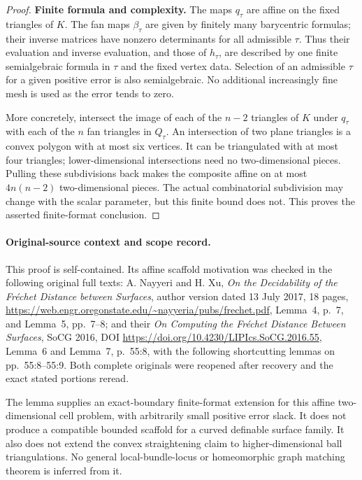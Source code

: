 \begin{proof}
\textbf{Finite formula and complexity.}\quad
The maps $q_\tau$ are affine on the fixed triangles of $K$.
The fan maps $\beta_\tau$ are given by finitely many barycentric
formulas; their inverse matrices have nonzero determinants for all
admissible $\tau$. Thus their evaluation and inverse evaluation,
and those of $h_\tau$, are described by one finite semialgebraic
formula in $\tau$ and the fixed vertex data. Selection of an
admissible $\tau$ for a given positive error is also semialgebraic.
No additional increasingly fine mesh is used as the error tends
to zero.

More concretely, intersect the image of each of the $n-2$ triangles
of $K$ under $q_\tau$ with each of the $n$ fan triangles in $Q_\tau$.
An intersection of two plane triangles is a convex polygon with at
most six vertices. It can be triangulated with at most four triangles;
lower-dimensional intersections need no two-dimensional pieces.
Pulling these subdivisions back makes the composite affine on at
most $4n(n-2)$ two-dimensional pieces. The actual combinatorial
subdivision may change with the scalar parameter, but this finite
bound does not. This proves the asserted finite-format conclusion.
\end{proof}

\paragraph{Original-source context and scope record.}
This proof is self-contained. Its affine scaffold motivation was
checked in the following original full texts: A. Nayyeri and H. Xu,
\emph{On the Decidability of the Fr\'echet Distance between Surfaces},
author version dated 13 July 2017, 18 pages,
\url{https://web.engr.oregonstate.edu/~nayyeria/pubs/frechet.pdf},
Lemma~4, p.~7, and Lemma~5, pp.~7--8; and their
\emph{On Computing the Fr\'echet Distance Between Surfaces},
SoCG 2016, DOI \url{https://doi.org/10.4230/LIPIcs.SoCG.2016.55},
Lemma~6 and Lemma~7, p.~55:8, with the following shortcutting lemmas
on pp.~55:8--55:9. Both complete originals were reopened after
recovery and the exact stated portions reread.

The lemma supplies an exact-boundary finite-format extension for
this affine two-dimensional cell problem, with arbitrarily small
positive error slack. It does not produce a compatible bounded
scaffold for a curved definable surface family. It also does not
extend the convex straightening claim to higher-dimensional ball
triangulations. No general local-bundle-locus or homeomorphic graph
matching theorem is inferred from it.
